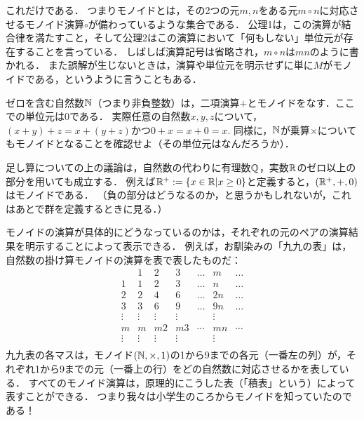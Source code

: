 \documentclass[11pt,a4paper]{jsarticle}
\begin{document}
これだけである．
つまりモノイドとは，その2つの元$m,n$をある元$m \circ n$に対応させるモノイド演算$\circ$が備わっているような集合である．
公理1は，この演算が結合律を満たすこと，そして公理2はこの演算において「何もしない」単位元が存在することを言っている．
しばしば演算記号は省略され，$m \circ n$は$mn$のように書かれる．
また誤解が生じないときは，演算や単位元を明示せずに単に$M$がモノイドである，というように言うこともある．


\begin{example}
ゼロを含む自然数$\mathbb{N}$（つまり非負整数）は，二項演算$+$とモノイドをなす．ここでの単位元は$0$である．
実際任意の自然数$x, y, z$について，$(x+y)+z = x + (y+z)$かつ$0 + x = x + 0 = x$. 
同様に，$\mathbb{N}$が乗算$\times$についてもモノイドとなることを確認せよ（その単位元はなんだろうか）．
\end{example}

\begin{example}
足し算についての上の議論は，自然数の代わりに有理数$\mathbb{Q}$，実数$\mathbb{R}$のゼロ以上の部分を用いても成立する．
例えば$\mathbb{R}^+ := \{ x \in \mathbb{R} | x \geq 0 \}$と定義すると，$(\mathbb{R}^+, +, 0)$はモノイドである．
（負の部分はどうなるのか，と思うかもしれないが，これはあとで群を定義するときに見る．）
\end{example}

モノイドの演算が具体的にどうなっているのかは，それぞれの元のペアの演算結果を明示することによって表示できる．
例えば，お馴染みの「九九の表」は，自然数の掛け算モノイドの演算を表で表したものだ：
\[
\begin{array}{c|cccccc}
       & 1 & 2 & 3 & \dots & m & \dots \\ \hline
     1 & 1 & 2 & 3 & \dots & n & \dots \\ 
     2 & 2 & 4 & 6 & \dots & 2n & \dots \\ 
     3 & 3 & 6 & 9 & \dots & 9n & \dots \\ 
     \vdots & \vdots & \vdots & \vdots & & \vdots & \\
     m & m & m2 & m3 & \cdots & mn & \cdots \\
     \vdots & \vdots & \vdots & \vdots & & \vdots & \\
\end{array}
\]
九九表の各マスは，モノイド$(\mathbb{N}, \times, 1)$の1から9までの各元（一番左の列）が，それぞれ1から9までの元（一番上の行）をどの自然数に対応させるかを表している．
すべてのモノイド演算は，原理的にこうした表（「積表」という）によって表すことができる．
つまり我々は小学生のころからモノイドを知っていたのである！
\end{document}
